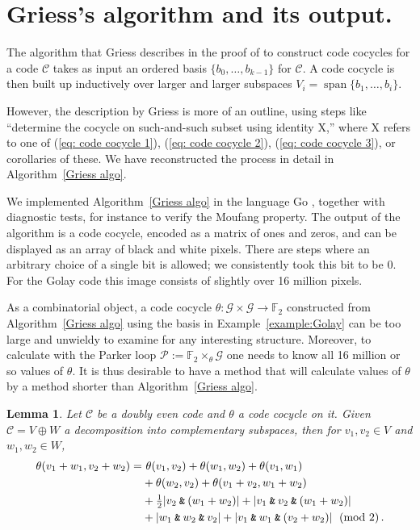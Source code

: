 \documentclass{article}
\theoremstyle{plain}
\newtheorem{lemma}{Lemma}
\theoremstyle{definition}
\def \cC {\mathcal{C}}
\def \cG {\mathcal{G}}
\def \cP {\mathcal{P}}
\def \FF {\mathbb{F}}
\newcommand{\AND}{\mathbin{\textup{\texttt{\&}}}}
\def\Plus{+}
\DeclareMathOperator{\Span}{span}
\begin{document}
\section{Griess's algorithm and its output.}

The algorithm that Griess describes in the proof of \cite[Theorem 10]{Griess} to construct code cocycles for a code $\cC$ takes as input an ordered  basis $\{b_0,\ldots,b_{k-1}\}$ for $\cC$. 
A code cocycle is then built up inductively over larger and larger subspaces $V_i = \Span\{b_1,\ldots,b_i\}$.%

However, the description by Griess is more of an outline, using steps like ``determine the cocycle on such-and-such subset using identity X,'' where X refers to one of (\ref{eq: code cocycle 1}), (\ref{eq: code cocycle 2}), (\ref{eq: code cocycle 3}), or corollaries of these. We have reconstructed the process in detail in Algorithm~\ref{Griess algo}.


We implemented Algorithm~\ref{Griess algo} in the language Go \cite{RN_GH}, together with diagnostic tests, for instance to verify the Moufang property.
The output of the algorithm is a code cocycle, encoded as a matrix of ones and zeros, and can be displayed as an array of black and white pixels. There are steps where an arbitrary choice of a single bit is allowed; we consistently took this bit to be 0.
For the Golay code this image consists of slightly over 16 million pixels.

As a combinatorial object, a code cocycle $\theta\colon \cG \times \cG\to \FF_2$ constructed from Algorithm~\ref{Griess algo} using the basis in Example~\ref{example:Golay} can be too large and unwieldy to examine for any interesting structure. 
Moreover, to calculate with the Parker loop $\cP := \FF_2\times_\theta \cG$ one needs to know all 16 million or so values of $\theta$.
It is thus desirable to have a method that will calculate values of $\theta$ by a method shorter than Algorithm~\ref{Griess algo}.

\begin{lemma}\label{lemma:formula lemma}
Let $\cC$ be a doubly even code and $\theta$ a code cocycle on it. 
Given $\cC = V\oplus W$ a decomposition into complementary subspaces, then for $v_1,v_2\in V$ and $w_1,w_2\in W$,
\begin{align}\label{eq:theformula}
	\theta(v_1\Plus w_1,v_2\Plus w_2)	
		 =&\ \theta(v_1,v_2)  + \theta(w_1,w_2) + \theta(v_1,w_1) \\
		&+ \theta(w_2,v_2) + \theta(v_1\Plus v_2,w_1\Plus w_2) \nonumber \\
							& + \tfrac12|v_2\AND(w_1\Plus w_2)| + |v_1\AND v_2 \AND (w_1\Plus w_2)| \nonumber \\
							&+|w_1\AND w_2 \AND v_2| + \left|v_1\AND w_1 \AND (v_2 \Plus  w_2)\right| \pmod 2\,. \nonumber
\end{align}
\end{lemma}
\end{document}
